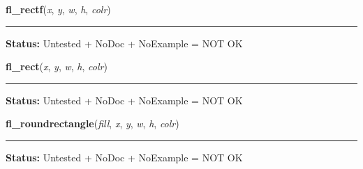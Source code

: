     \label{xformslib:library:fl_rectf}

    \vspace{0.5ex}

\hspace{.8\funcindent}\begin{boxedminipage}{\funcwidth}

    \raggedright \textbf{fl\_rectf}(\textit{x}, \textit{y}, \textit{w}, \textit{h}, \textit{colr})

    \vspace{-1.5ex}

    \rule{\textwidth}{0.5\fboxrule}
\setlength{\parskip}{2ex}
\setlength{\parskip}{1ex}
\textbf{Status:} Untested + NoDoc + NoExample = NOT OK



    \end{boxedminipage}

    \label{xformslib:library:fl_rect}

    \vspace{0.5ex}

\hspace{.8\funcindent}\begin{boxedminipage}{\funcwidth}

    \raggedright \textbf{fl\_rect}(\textit{x}, \textit{y}, \textit{w}, \textit{h}, \textit{colr})

    \vspace{-1.5ex}

    \rule{\textwidth}{0.5\fboxrule}
\setlength{\parskip}{2ex}
\setlength{\parskip}{1ex}
\textbf{Status:} Untested + NoDoc + NoExample = NOT OK



    \end{boxedminipage}

    \label{xformslib:library:fl_roundrectangle}

    \vspace{0.5ex}

\hspace{.8\funcindent}\begin{boxedminipage}{\funcwidth}

    \raggedright \textbf{fl\_roundrectangle}(\textit{fill}, \textit{x}, \textit{y}, \textit{w}, \textit{h}, \textit{colr})

    \vspace{-1.5ex}

    \rule{\textwidth}{0.5\fboxrule}
\setlength{\parskip}{2ex}
\setlength{\parskip}{1ex}
\textbf{Status:} Untested + NoDoc + NoExample = NOT OK



    \end{boxedminipage}

